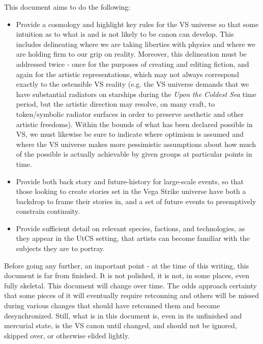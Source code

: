 This document aims to do the following:
\begin{itemize}
\item Provide a cosmology and highlight key rules for the VS universe
   so that some intuition as to what is and is not likely to be canon
   can develop. This includes delineating where we are taking
   liberties with physics and where we are holding firm to our grip on
   reality. Moreover, this delineation must be addressed twice - once
   for the purposes of creating and editing fiction, and again for the
   artistic representations, which may not always correspond exactly
   to the ostensible VS reality (e.g. the VS universe demands that we
   have substantial radiators on starships during the {\it Upon the
   Coldest Sea} time period, but the artistic direction may resolve,
   on many craft, to token/symbolic radiator surfaces in order to preserve
   aesthetic and other artistic freedoms). Within the bounds of what
   has been declared possible in VS, we must likewise be sure to
   indicate where optimism is assumed and where the VS universe makes
   more pessimistic assumptions about how much of the possible is
   actually achievable by given groups at particular points in time.
\item Provide both back story and future-history for large-scale
  events, so that those looking to create stories set in the Vega
  Strike universe have both a backdrop to frame their stories in, and
  a set of future events to preemptively constrain continuity.
\item Provide sufficient detail on relevant species, factions, and
  technologies, as they appear in the UtCS setting, that artists can
  become familiar with the subjects they are to portray.
\end{itemize}

Before going any further, an important point - at the time of this
writing, this document is far from finished. It is not polished, it is
not, in some places, even fully skeletal. This document will change
over time. The odds approach certainty that some pieces of it will
eventually require retconning and others will be missed during various
changes that should have retconned them and become
desynchronized. Still, what is in this document is, even in its
unfinished and mercurial state, is the VS canon until changed, and
should not be ignored, skipped over, or otherwise elided lightly.


